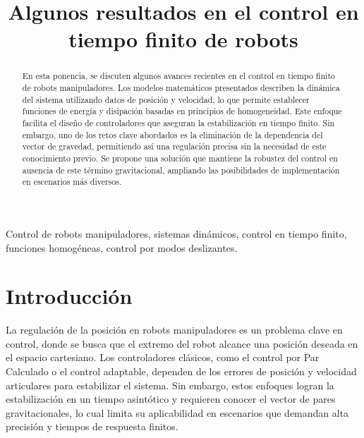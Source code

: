 \documentclass[conference]{IEEEtran}
\begin{document}
\title{Algunos resultados en el control en tiempo finito de robots\\
}

\author{
	\and
}

\maketitle

\begin{abstract}
	En esta ponencia, se discuten algunos avances recientes en el control en tiempo finito de robots manipuladores. Los modelos matemáticos presentados describen la dinámica del sistema utilizando datos de posición y velocidad, lo que permite establecer funciones de energía y disipación basadas en principios de homogeneidad. Este enfoque facilita el diseño de controladores que aseguran la estabilización en tiempo finito. Sin embargo, uno de los retos clave abordados es la eliminación de la dependencia del vector de gravedad, permitiendo así una regulación precisa sin la necesidad de este conocimiento previo. Se propone una solución que mantiene la robustez del control en ausencia de este término gravitacional, ampliando las posibilidades de implementación en escenarios más diversos.
\end{abstract}

\begin{IEEEkeywords}
	Control de robots manipuladores, sistemas dinámicos, control en tiempo finito, funciones homogéneas, control por modos deslizantes.
\end{IEEEkeywords}

\section{Introducción}

La regulación de la posición en robots manipuladores es un problema clave en control, donde se busca que el extremo del robot alcance una posición deseada en el espacio cartesiano. Los controladores clásicos, como el control por Par Calculado o el control adaptable, dependen de los errores de posición y velocidad articulares para estabilizar el sistema. Sin embargo, estos enfoques logran la estabilización en un tiempo asintótico y requieren conocer el vector de pares gravitacionales, lo cual limita su aplicabilidad en escenarios que demandan alta precisión y tiempos de respuesta finitos.
\end{document}

